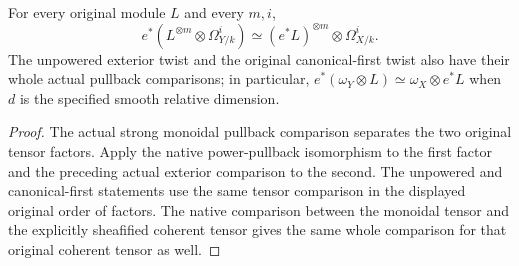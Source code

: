 \begin{corollary}
\label{cor:kn-scheme-iso-hodge-tensor-pullback}
\leanok
{}
For every original module $L$ and every $m,i$,
\[
 e^*(L^{\otimes m}\otimes\Omega^i_{Y/k})
 \simeq(e^*L)^{\otimes m}\otimes\Omega^i_{X/k}.
\]
The unpowered exterior twist and the original canonical-first twist
also have their whole actual pullback comparisons; in particular,
$e^*(\omega_Y\otimes L)\simeq\omega_X\otimes e^*L$ when $d$ is the
specified smooth relative dimension.
\end{corollary}
\begin{proof}
The actual strong monoidal pullback comparison separates the two
original tensor factors.  Apply the native power-pullback isomorphism
to the first factor and the preceding actual exterior comparison to
the second.  The unpowered and canonical-first statements use the
same tensor comparison in the displayed original order of factors.
The native comparison between the monoidal tensor and the explicitly
sheafified coherent tensor gives the same whole comparison for that
original coherent tensor as well.
\end{proof}
